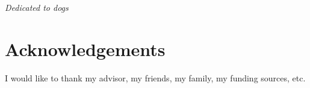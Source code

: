 \thispagestyle{empty}
\vspace*{\fill}
\hspace*{\fill}\textit{Dedicated to dogs}\hspace*{\fill}
\vspace*{\fill}
\newpage
\chapter*{Acknowledgements}
I would like to thank my advisor, my friends, my family, my funding sources, etc.